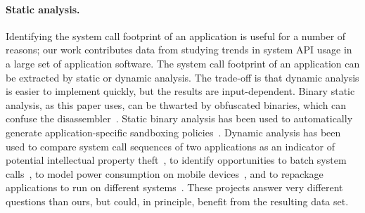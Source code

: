 

\paragraph{Static analysis.}
Identifying the system call footprint of an application is useful for a number of reasons;
our work contributes data from studying trends in system API usage in a large set of application software.
The system call footprint of an application can be extracted by static or dynamic analysis.
The trade-off is that dynamic analysis is easier to implement quickly, but the results are input-dependent.
Binary static analysis, as this paper uses, 
can be thwarted by obfuscated binaries,
which can confuse the disassembler~\citep{zhang13cfi}.
Static binary analysis has been used to automatically generate application-specific sandboxing 
policies~\citep{policy-extraction}.
Dynamic analysis has been used to compare system call sequences of two applications
as an indicator of potential intellectual property theft~\citep{software-theft},
to identify opportunities to batch system calls~\citep{multi-call},
to model power consumption on mobile devices~\citep{power-modelling},
and to repackage applications to run on different systems~\citep{cde}.
These projects answer very different questions than ours, but could, in principle, benefit
from the resulting data set.

